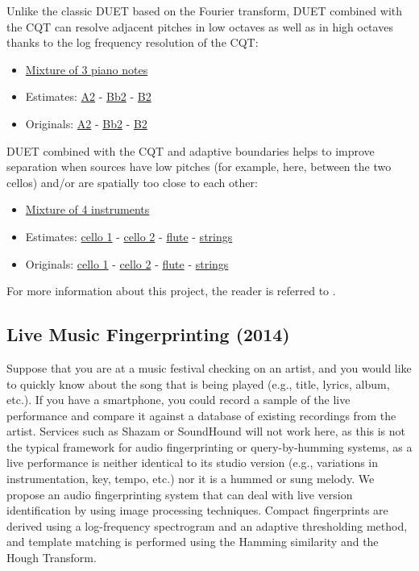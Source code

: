 \documentclass{article}
\begin{document}
Unlike the classic DUET based on the Fourier transform, DUET combined with the CQT can resolve adjacent pitches in low octaves as well as in high octaves thanks to the log frequency resolution of the CQT:
\begin{itemize}[noitemsep,topsep=0pt]
\item \href{Audio/DUET/piano_mixture.mp3}{Mixture of 3 piano notes}
\item Estimates: \href{Audio/DUET/A2_estimated.mp3}{A2} - \href{Audio/DUET/Bb2_estimated.mp3}{Bb2} -  \href{Audio/DUET/B2_estimated.mp3}{B2}
\item Originals: \href{Audio/DUET/A2_original.mp3}{A2} - \href{Audio/DUET/Bb2_original.mp3}{Bb2} - \href{Audio/DUET/B2_original.mp3}{B2}
\end{itemize}

DUET combined with the CQT and adaptive boundaries helps to improve separation when sources have low pitches (for example, here, between the two cellos) and/or are spatially too close to each other:
\begin{itemize}[noitemsep,topsep=0pt]
\item \href{Audio/DUET/instruments_mixture.mp3}{Mixture of 4 instruments}
\item Estimates: \href{Audio/DUET/cello1_estimated.mp3}{cello 1} - \href{Audio/DUET/cello2_estimated.mp3}{cello 2} - \href{Audio/DUET/flute_estimated.mp3}{flute} - \href{Audio/DUET/strings_estimated.mp3}{strings}
\item Originals: \href{Audio/DUET/cello1_original.mp3}{cello 1} - \href{Audio/DUET/cello2_original.mp3}{cello 2} - \href{Audio/DUET/flute_original.mp3}{flute} - \href{Audio/DUET/strings_original.mp3}{strings}
\end{itemize}

For more information about this project, the reader is referred to \cite{inproceedings_rafii_may2011_2}.


\subsection{Live Music Fingerprinting (2014)}
\label{ssec:live} 

Suppose that you are at a music festival checking on an artist, and you would like to quickly know about the song that is being played (e.g., title, lyrics, album, etc.). If you have a smartphone, you could record a sample of the live performance and compare it against a database of existing recordings from the artist. Services such as Shazam or SoundHound will not work here, as this is not the typical framework for audio fingerprinting or query-by-humming systems, as a live performance is neither identical to its studio version (e.g., variations in instrumentation, key, tempo, etc.) nor it is a hummed or sung melody. We propose an audio fingerprinting system that can deal with live version identification by using image processing techniques. Compact fingerprints are derived using a log-frequency spectrogram and an adaptive thresholding method, and template matching is performed using the Hamming similarity and the Hough Transform.
\end{document}
